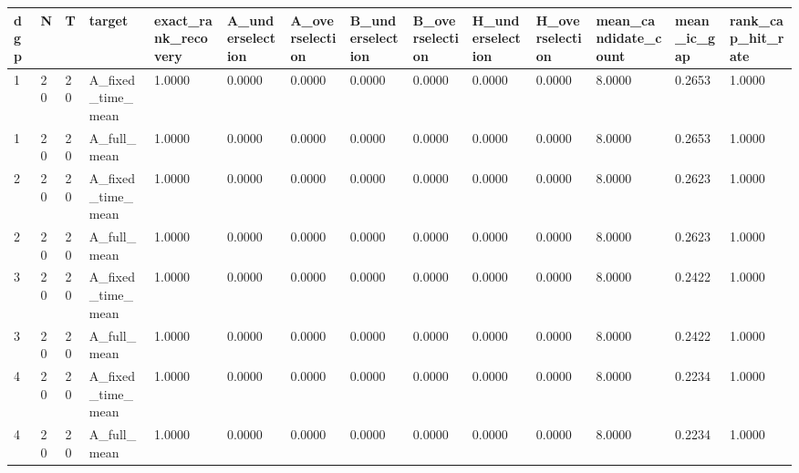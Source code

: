 \begin{tabular}{llllllllllllll}
\toprule
dgp & N & T & target & exact\_rank\_recovery & A\_underselection & A\_overselection & B\_underselection & B\_overselection & H\_underselection & H\_overselection & mean\_candidate\_count & mean\_ic\_gap & rank\_cap\_hit\_rate \\
\midrule
1 & 20 & 20 & A\_fixed\_time\_mean & 1.0000 & 0.0000 & 0.0000 & 0.0000 & 0.0000 & 0.0000 & 0.0000 & 8.0000 & 0.2653 & 1.0000 \\
1 & 20 & 20 & A\_full\_mean & 1.0000 & 0.0000 & 0.0000 & 0.0000 & 0.0000 & 0.0000 & 0.0000 & 8.0000 & 0.2653 & 1.0000 \\
2 & 20 & 20 & A\_fixed\_time\_mean & 1.0000 & 0.0000 & 0.0000 & 0.0000 & 0.0000 & 0.0000 & 0.0000 & 8.0000 & 0.2623 & 1.0000 \\
2 & 20 & 20 & A\_full\_mean & 1.0000 & 0.0000 & 0.0000 & 0.0000 & 0.0000 & 0.0000 & 0.0000 & 8.0000 & 0.2623 & 1.0000 \\
3 & 20 & 20 & A\_fixed\_time\_mean & 1.0000 & 0.0000 & 0.0000 & 0.0000 & 0.0000 & 0.0000 & 0.0000 & 8.0000 & 0.2422 & 1.0000 \\
3 & 20 & 20 & A\_full\_mean & 1.0000 & 0.0000 & 0.0000 & 0.0000 & 0.0000 & 0.0000 & 0.0000 & 8.0000 & 0.2422 & 1.0000 \\
4 & 20 & 20 & A\_fixed\_time\_mean & 1.0000 & 0.0000 & 0.0000 & 0.0000 & 0.0000 & 0.0000 & 0.0000 & 8.0000 & 0.2234 & 1.0000 \\
4 & 20 & 20 & A\_full\_mean & 1.0000 & 0.0000 & 0.0000 & 0.0000 & 0.0000 & 0.0000 & 0.0000 & 8.0000 & 0.2234 & 1.0000 \\
\bottomrule
\end{tabular}
